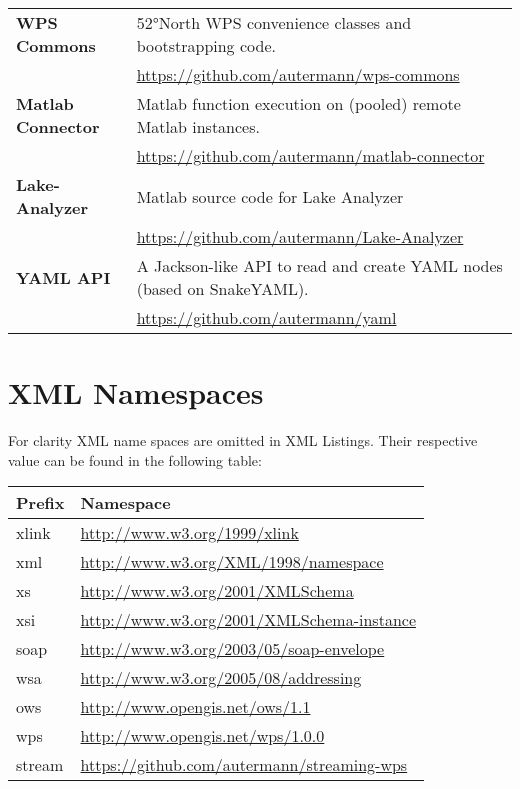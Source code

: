 \documentclass[paper=a4,
               fontsize=11pt,
               bibliography=totoc,
               listof=nochaptergap,
               listof=notoc,
               numbers=noendperiod,
               parskip=half,
               footnotes=multiple,
               toc=numberline,
               captions=tableheading,
               DIV=10,
              ]{scrreprt}
\begin{document}
\begin{appendix}
\begin{tabularx}{\textwidth}{@{}lX@{}}
        \textbf{WPS Commons}
        & 52°North WPS convenience classes and bootstrapping code.\\
        & \url{https://github.com/autermann/wps-commons}\\
        \cmidrule(r){1-1}
        \cmidrule(l){2-2}

        \textbf{Matlab Connector}
        & Matlab function execution on (pooled) remote Matlab instances.\\
        & \url{https://github.com/autermann/matlab-connector}\\
        \cmidrule(r){1-1}
        \cmidrule(l){2-2}

        \textbf{Lake-Analyzer}
        & Matlab source code for Lake Analyzer\\
        & \url{https://github.com/autermann/Lake-Analyzer}\\
        \cmidrule(r){1-1}
        \cmidrule(l){2-2}

        \textbf{YAML API}
        & A Jackson-like API to read and create YAML nodes (based on SnakeYAML).\\
        & \url{https://github.com/autermann/yaml}\\
        \bottomrule
      \end{tabularx}

    \chapter{XML Namespaces}\label{sec:xmlnamespaces}
      For clarity XML name spaces are omitted in XML Listings. Their respective value can be found in the following table:
      \begin{center}
        \centering
        \begin{tabular}{@{}ll@{}}
          Prefix & Namespace \\\midrule
          xlink  & \url{http://www.w3.org/1999/xlink}\\
          xml    & \url{http://www.w3.org/XML/1998/namespace}\\
          xs     & \url{http://www.w3.org/2001/XMLSchema}\\
          xsi    & \url{http://www.w3.org/2001/XMLSchema-instance}\\
          soap   & \url{http://www.w3.org/2003/05/soap-envelope}\\
          wsa    & \url{http://www.w3.org/2005/08/addressing}\\
          ows    & \url{http://www.opengis.net/ows/1.1}\\
          wps    & \url{http://www.opengis.net/wps/1.0.0}\\
          stream & \url{https://github.com/autermann/streaming-wps} \\
        \end{tabular}
      \end{center}
  \end{appendix}
\end{document}
